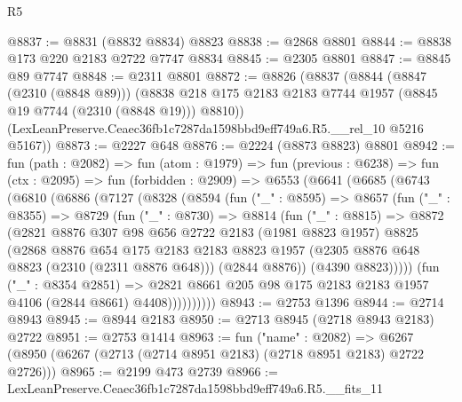 \begin{lexlean}{R5}
\begin{coremodule}
@8837 := @8831 (@8832 @8834) @8823
@8838 := @2868 @8801
@8844 := @8838 @173 @220 @2183 @2722 @7747 @8834
@8845 := @2305 @8801
@8847 := @8845 @89 @7747
@8848 := @2311 @8801
@8872 := @8826
    (@8837
      (@8844
        (@8847 (@2310 (@8848 @89)))
        (@8838 @218 @175 @2183 @2183 @7744 @1957 (@8845 @19 @7744 (@2310 (@8848 @19))) @8810))
      (LexLeanPreserve.Ceaec36fb1c7287da1598bbd9eff749a6.R5.__rel_10 @5216 @5167))
@8873 := @2227 @648
@8876 := @2224 (@8873 @8823) @8801
@8942 := fun (path : @2082) =>
  fun (atom : @1979) =>
  fun (previous : @6238) =>
  fun (ctx : @2095) =>
  fun (forbidden : @2909) =>
  @6553
    (@6641
      (@6685
        (@6743
          (@6810
            (@6886
              (@7127
                (@8328
                  (@8594
                    (fun ("_" : @8595) =>
                    @8657
                      (fun ("_" : @8355) =>
                      @8729
                        (fun ("_" : @8730) =>
                        @8814
                          (fun ("_" : @8815) =>
                          @8872
                            (@2821
                              @8876
                              @307
                              @98
                              @656
                              @2722
                              @2183
                              (@1981 @8823 @1957)
                              @8825
                              (@2868
                                @8876
                                @654
                                @175
                                @2183
                                @2183
                                @8823
                                @1957
                                (@2305 @8876 @648 @8823 (@2310 (@2311 @8876 @648)))
                                (@2844 @8876))
                              (@4390 @8823)))))
                      (fun ("_" : @8354 @2851) =>
                      @2821
                        @8661
                        @205
                        @98
                        @175
                        @2183
                        @2183
                        @1957
                        @4106
                        (@2844 @8661)
                        @4408))))))))))
@8943 := @2753 @1396
@8944 := @2714 @8943
@8945 := @8944 @2183
@8950 := @2713 @8945 (@2718 @8943 @2183) @2722
@8951 := @2753 @1414
@8963 := fun ("name" : @2082) =>
  @6267 (@8950 (@6267 (@2713 (@2714 @8951 @2183) (@2718 @8951 @2183) @2722 @2726)))
@8965 := @2199 @473 @2739
@8966 := LexLeanPreserve.Ceaec36fb1c7287da1598bbd9eff749a6.R5.__fits_11

\end{coremodule}
\end{lexlean}
